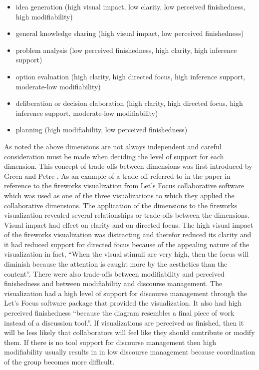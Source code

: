 \documentclass{sig-alternate}
\begin{document}
  \begin{itemize}
    \item idea generation (high visual impact, low clarity, low perceived
    finishedness, high modifiability) \item general knowledge sharing (high
    visual impact, low perceived finishedness)
\item problem analysis (low perceived finishedness, high clarity, high
inference support) \item option evaluation (high clarity, high directed focus,
high inference support, moderate-low modifiability) \item deliberation or
decision elaboration (high clarity, high directed focus, high inference
support, moderate-low modifiability)

\item planning (high modifiability, low perceived finishedness)
\end{itemize}
As noted the above dimensions are not always independent and careful
consideration must be made when deciding the level of support for each
dimension. This concept of trade-offs between dimensions was first introduced
by Green and Petre \cite{Green:1996:UsabilityAnalysisOfVisualProgrammingEnvironments}.
As an example of a trade-off referred to in the paper in reference to the
fireworks  visualization from Let's Focus collaborative software which was used
as one of  the three visualizations to which they applied the collaborative
dimensions.   The application of the dimensions to the fireworks visualization
revealed several relationships or trade-offs between the dimensions. Visual
impact had effect on clarity and on directed focus. The high visual impact of
the fireworks visualization was distracting and therefor reduced its clarity and
it had reduced support for directed focus because of the appealing nature of the
visualization in fact, ``When the visual stimuli are very high, then the focus
will diminish because the attention is caught more by the aesthetics than the
content''\cite{Bresciani:ACollaborativeDimensionsFramework}. There were also
trade-offs between modifiability and perceived finishedness and between
modifiability and discourse management. The visualization had a high level of
support for discourse management through the Let's Focus software package that
provided the visualization. It also had high perceived finishedness ``because
the diagram resembles a final piece of work instead of a discussion
tool.''\cite{Bresciani:ACollaborativeDimensionsFramework}. If visualizations are
perceived as finished, then it will be less likely that collaborators will feel
like they should contribute or modify them. If there is no tool support for
discourse management then high modifiability usually results in in low discourse
management because coordination of the group becomes more difficult.
\end{document}

